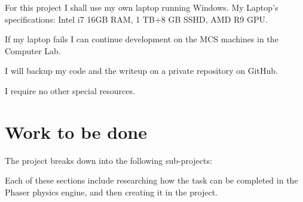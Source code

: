 \documentclass[12pt,a4paper,twoside]{article}
\begin{document}

For this project I shall use my own laptop running Windows.
My Laptop's specifications:
Intel i7 16GB RAM, 1 TB+8 GB SSHD, AMD R9 GPU.

If my laptop fails I can continue development on the MCS machines in the Computer Lab.

I will backup my code and the writeup on a private repository on GitHub.

I require no other special resources.

\section*{Work to be done}


The project breaks down into the following sub-projects:

Each of these sections include researching how the task can be completed in the Phaser physics engine, and then creating it in the project.


 


\newcommand{\WorkA}{Create a ragdoll model of the runner's body out of Phaser sprites with correct distance constraints between sections so that it keeps together whilst collapsing to the floor. }
\newcommand{\WorkB}{Ensure the body has inertia, give the floor friction and apply other physics features so the body acts like a runner rather than collapsing on itself. }
\newcommand{\WorkC}{Make the athlete controllable using the Q, W, O and P keys. Receive this input into the game, and give the correct rotational force to each section of the body as in the original game. }
\newcommand{\WorkD}{Add constraints on how far a joint can rotate. Add these constraints on the model of the athlete so the runner has human-like joint constraints. }
\newcommand{\WorkE}{Add graphics to the body; render an image for each sprite joint in order that together they look like an athlete's body. }
\newcommand{\WorkF}{Calculate and display the distance the runner has moved from the start and how long it has taken. }
\newcommand{\WorkG}{Add collision detection with the floor for the parts of the body that touch the floor when the runner falls over. Restart the game when the athlete falls over. }
\newcommand{\WorkH}{Check whether the runner has finished the race by checking whether the distance travelled is over 100m, and if so, record the time it took to complete the race. }
\end{document}
